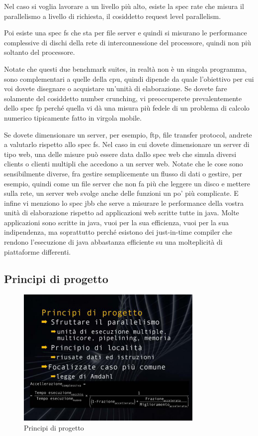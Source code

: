 Nel caso si voglia lavorare a un livello più alto, esiste la spec rate che misura il parallelismo a livello di richiesta, il cosiddetto request level parallelism.

Poi esiste una spec fs che sta per file server e quindi si misurano le performance complessive di dischi della rete di interconnessione del processore, quindi non più soltanto del processore.

Notate che questi due benchmark suites, in realtà non è un singola programma, sono complementari a quelle della cpu, quindi dipende da quale l'obiettivo per cui voi dovete disegnare o acquistare un'unità di elaborazione.
Se dovete fare solamente del cosiddetto number crunching, vi preoccuperete prevalentemente dello spec fp perché quella vi dà una misura più fedele di un problema di calcolo numerico tipicamente fatto in virgola mobile.

Se dovete dimensionare un server, per esempio, ftp, file transfer protocol, andrete a valutarlo rispetto allo spec fs.
Nel caso in cui dovete dimensionare un server di tipo web, una delle misure può essere data dallo spec web che simula diversi clients o clienti multipli che accedono a un server web.
Notate che le cose sono sensibilmente diverse, fra gestire semplicemente un flusso di dati o gestire, per esempio, quindi come un file server che non fa più che leggere un disco e mettere sulla rete, un server web svolge anche delle funzioni un po' più complicate.
E infine vi menziono lo spec jbb che serve a misurare le performance della vostra unità di elaborazione rispetto ad applicazioni web scritte tutte in java.
Molte applicazioni sono scritte in java, vuoi per la sua efficienza, vuoi per la sua indipendenza, ma soprattutto perché esistono dei just-in-time compiler che rendono l'esecuzione di java abbastanza efficiente su una molteplicità di piattaforme differenti.

\subsection{Principi di progetto}

\FloatBarrier
\begin{figure}[H]
  \centering
  \includegraphics[width=0.80\textwidth,
                    trim=10 40 10 40, %
                    clip]
                    {images/Lez03_p04_fig_03.png}
  \caption{Principi di progetto}
  \label{fig:Lez03_p04_fig_03}
\end{figure}
\FloatBarrier
\noindent

